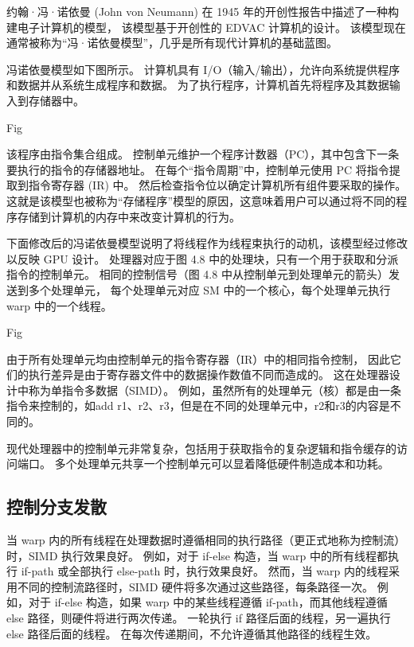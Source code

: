 \begin{remark}[线程束与SIMD硬件]
约翰·冯·诺依曼 (John von Neumann) 在 1945 年的开创性报告中描述了一种构建电子计算机的模型，
该模型基于开创性的 EDVAC 计算机的设计。 该模型现在通常被称为“冯·诺依曼模型”，几乎是所有现代计算机的基础蓝图。

冯诺依曼模型如下图所示。 计算机具有 I/O（输入/输出），允许向系统提供程序和数据并从系统生成程序和数据。 
为了执行程序，计算机首先将程序及其数据输入到存储器中。

{\color{red} Fig}

该程序由指令集合组成。 控制单元维护一个程序计数器（PC），其中包含下一条要执行的指令的存储器地址。 
在每个“指令周期”中，控制单元使用 PC 将指令提取到指令寄存器 (IR) 中。 然后检查指令位以确定计算机所有组件要采取的操作。 
这就是该模型也被称为“存储程序”模型的原因，这意味着用户可以通过将不同的程序存储到计算机的内存中来改变计算机的行为。

下面修改后的冯诺依曼模型说明了将线程作为线程束执行的动机，该模型经过修改以反映 GPU 设计。 
处理器对应于图 4.8 中的处理块，只有一个用于获取和分派指令的控制单元。 
相同的控制信号（图 4.8 中从控制单元到处理单元的箭头）发送到多个处理单元，
每个处理单元对应 SM 中的一个核心，每个处理单元执行 warp 中的一个线程。

{\color{red} Fig}

由于所有处理单元均由控制单元的指令寄存器（IR）中的相同指令控制，
因此它们的执行差异是由于寄存器文件中的数据操作数值不同而造成的。 这在处理器设计中称为单指令多数据（SIMD）。 
例如，虽然所有的处理单元（核）都是由一条指令来控制的，如add r1、r2、r3，但是在不同的处理单元中，r2和r3的内容是不同的。

现代处理器中的控制单元非常复杂，包括用于获取指令的复杂逻辑和指令缓存的访问端口。 
多个处理单元共享一个控制单元可以显着降低硬件制造成本和功耗。
\end{remark}

\subsection{控制分支发散}
当 warp 内的所有线程在处理数据时遵循相同的执行路径（更正式地称为控制流）时，SIMD 执行效果良好。 
例如，对于 if-else 构造，当 warp 中的所有线程都执行 if-path 或全部执行 else-path 时，执行效果良好。 
然而，当 warp 内的线程采用不同的控制流路径时，SIMD 硬件将多次通过这些路径，每条路径一次。 
例如，对于 if-else 构造，如果 warp 中的某些线程遵循 if-path，而其他线程遵循 else 路径，则硬件将进行两次传递。 
一轮执行 if 路径后面的线程，另一遍执行 else 路径后面的线程。 在每次传递期间，不允许遵循其他路径的线程生效。

